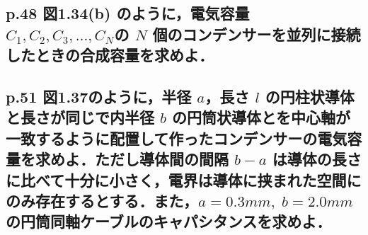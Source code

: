 \documentclass[a4paper, 12pt]{bxjsarticle}
\begin{document}
\subsection{p.48 図1.34(b) のように，電気容量 \(C_1,C_2,C_3,\ldots,C_N\)の \(N\) 個のコンデンサーを並列に接続したときの合成容量を求めよ．}

\newpage
\subsection{p.51 図1.37のように，半径 \(a\)，長さ \(l\) の円柱状導体と長さが同じで内半径 \(b\) の円筒状導体とを中心軸が一致するように配置して作ったコンデンサーの電気容量を求めよ．ただし導体間の間隔 \(b-a\) は導体の長さに比べて十分に小さく，電界は導体に挟まれた空間にのみ存在するとする．また，\(a=0.3\si{mm},\;b=2.0\si{mm}\) の円筒同軸ケーブルのキャパシタンスを求めよ．}
\end{document}
